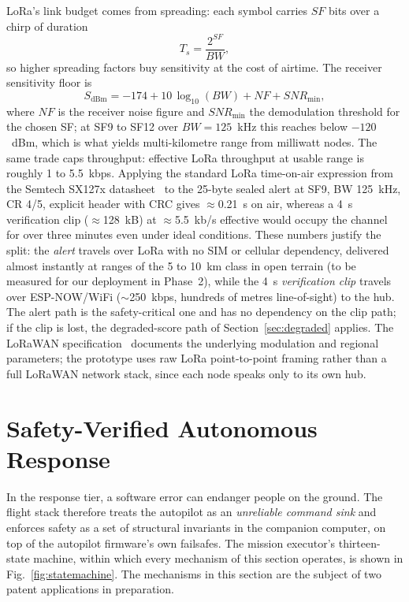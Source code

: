 \documentclass[journal]{IEEEtran}
\begin{document}
LoRa's link budget comes from spreading: each symbol carries $\mathit{SF}$
bits over a chirp of duration
\begin{equation}
\label{eq:symbolduration}
T_s = \frac{2^{\mathit{SF}}}{\mathit{BW}},
\end{equation}
so higher spreading factors buy sensitivity at the cost of airtime. The
receiver sensitivity floor is
\begin{equation}
\label{eq:sensitivity}
S_{\mathrm{dBm}} = -174 + 10\,\log_{10}(\mathit{BW}) + \mathit{NF} +
\mathit{SNR}_{\min},
\end{equation}
where $\mathit{NF}$ is the receiver noise figure and $\mathit{SNR}_{\min}$
the demodulation threshold for the chosen SF; at SF9 to SF12 over
$\mathit{BW} = 125$~kHz this reaches below $-120$~dBm, which is what yields
multi-kilometre range from milliwatt nodes. The same trade caps throughput:
effective LoRa throughput at usable range is roughly 1 to 5.5~kbps. Applying
the standard LoRa time-on-air expression from the Semtech SX127x
datasheet~\cite{sx1278} to the 25-byte sealed alert at SF9, BW 125~kHz, CR
4/5, explicit header with CRC gives $\approx$0.21~s on air, whereas a 4~s
verification clip ($\approx$128~kB) at $\approx$5.5~kb/s effective would
occupy the channel for over three minutes even under ideal
conditions. These numbers justify the split: the
\emph{alert} travels over LoRa with no SIM or cellular dependency, delivered
almost instantly at ranges of the 5 to 10~km class in open terrain (to be
measured for our deployment in Phase~2), while the 4~s \emph{verification
clip} travels over ESP-NOW/WiFi ($\sim$250~kbps, hundreds of metres
line-of-sight) to the hub. The alert path is the safety-critical one and has
no dependency on the clip path; if the clip is lost, the degraded-score path
of Section~\ref{sec:degraded} applies. The LoRaWAN
specification~\cite{lorawan} documents the underlying modulation and
regional parameters; the prototype uses raw LoRa point-to-point framing
rather than a full LoRaWAN network stack, since each node speaks only to its
own hub.

\section{Safety-Verified Autonomous Response}
\label{sec:safety}

In the response tier, a software error can endanger people on the ground.
The flight stack therefore treats the
autopilot as an \emph{unreliable command sink} and enforces safety as a set
of structural invariants in the companion computer, on top of
the autopilot firmware's own failsafes. The mission executor's
thirteen-state machine, within which every mechanism of this section
operates, is shown in Fig.~\ref{fig:statemachine}. The mechanisms in this
section are the subject of two patent applications in preparation.
\end{document}
